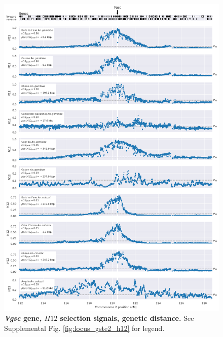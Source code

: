 \documentclass[a4paper,11pt,abstracton,hidelinks]{scrartcl}
\begin{document}
\begin{figure}[t!]
	\begin{center}
		\includegraphics*[width=1\linewidth,center]{artwork/locus_vgsc_h12_gdist.png}
	\end{center}
	\caption[\textit{Vgsc} gene, $H12$ selection signals, genetic distance]{
	\textbf{\textit{Vgsc} gene, $H12$ selection signals, genetic distance.}
	See Supplemental Fig. \ref{fig:locus_gste2_h12} for legend.
	} 
	\label{fig:locus_vgsc_h12_gdist}
\end{figure}


\clearpage
\end{document}
